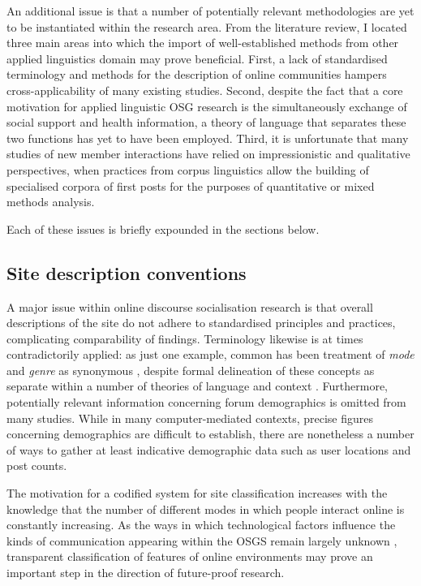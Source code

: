 	  An additional issue is that a number of potentially relevant methodologies are yet to be instantiated within the research area. From the literature review, I located three main areas into which the import of well-established methods from other applied linguistics domain may prove beneficial. First, a lack of standardised terminology and methods for the description of online communities hampers cross-applicability of many existing studies. Second, despite the fact that a core motivation for applied linguistic OSG research is the simultaneously exchange of social support and health information, a theory of language that separates these two functions has yet to have been employed. Third, it is unfortunate that many studies of new member interactions have relied on impressionistic and qualitative perspectives, when practices from corpus linguistics allow the building of specialised corpora of first posts for the purposes of quantitative or mixed methods analysis.

	  Each of these issues is briefly expounded in the sections below.

	  \subsection{Site description conventions}

		 A major issue within online discourse socialisation research is that overall descriptions of the site do not adhere to standardised principles and practices, complicating comparability of findings. Terminology likewise is at times contradictorily applied: as just one example, common has been treatment of \emph{mode} and \emph{genre} as synonymous \cite{herring_gender_2006}, despite formal delineation of these concepts as separate within a number of theories of language and context \cite{halliday_introduction:_2004}. Furthermore, potentially relevant information concerning forum demographics is omitted from many studies. While in many computer-mediated contexts, precise figures concerning demographics are difficult to establish, there are nonetheless a number of ways to gather at least indicative demographic data such as user locations and post counts. %

		 The motivation for a codified system for site classification increases with the knowledge that the number of different modes in which people interact online is constantly increasing. As the ways in which technological factors influence the kinds of communication appearing within the OSGS remain largely unknown \cite{herring_faceted_2007}, transparent classification of features of online environments may prove an important step in the direction of future-proof research.


